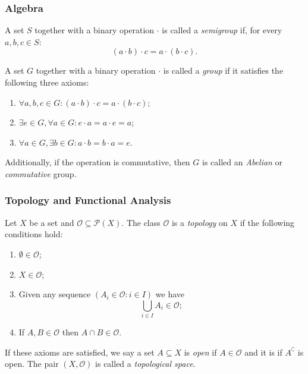 \subsubsection{Algebra}
\begin{definition}
	A set $S$ together with a binary operation $\cdot$ is called a \textit{semigroup} if, for every $a, b, c \in S$:
	\[
	(a \cdot b) \cdot c = a \cdot (b \cdot c).
	\]
\end{definition}

\begin{definition}
	A set $G$ together with a binary operation $\cdot$ is called a \textit{group} if it satisfies the following three axioms:
	\begin{enumerate}
		\item  $\forall a, b, c \in G: (a \cdot b) \cdot c = a \cdot (b \cdot c)$;
		\item $\exists e \in G, \forall a \in G:  e \cdot a = a \cdot e = a$;
		\item $\forall a \in G, \exists b \in G: a \cdot b = b \cdot a = e$.
	\end{enumerate}
Additionally, if the operation is commutative, then $G$ is called an \textit{Abelian} or \textit{commutative} group.
\end{definition}

\subsubsection{Topology and Functional Analysis}

\begin{definition}
	Let $X$ be a set and $\mathcal{O} \subseteq \mathcal{P}(X)$. The class $\mathcal{O}$ is a \textit{topology} on $X$ if the following conditions hold:
	\begin{enumerate}
		\item $\emptyset \in \mathcal{O}$;
		\item $X \in \mathcal{O}$;
		\item  Given any sequence $(A_i \in \mathcal{O} : i \in I)$ we have 
		\[
		\bigcup_{i \in I} A_i  \in \mathcal{O};
		\]
		\item If $A, B \in \mathcal{O}$ then $A \cap B \in \mathcal{O}$.
	\end{enumerate}
If these axioms are satisfied, we say a set $A \subseteq X$ is \textit{open} if $A \in \mathcal{O}$ and it is  if $A^\complement$ is open. The pair $(X, \mathcal{O})$ is called a \textit{topological space}.
\end{definition}

